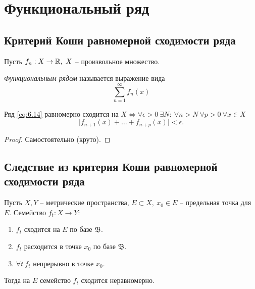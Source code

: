 \section{Функциональный ряд}

\setcounter{subsection}{79}

\subsection{Критерий Коши равномерной сходимости ряда}

\begin{definition}
    Пусть $f_n: X \rightarrow\mathbb{R}, \ X$ -- произвольное множество.

    \emph{Функциональным рядом} называется выражение вида
    \begin{equation}\label{eq:6.14}
        \sum_{n=1}^{\infty}f_n(x)
    \end{equation}
\end{definition}

\begin{theorem}
    Ряд \ref{eq:6.14} равномерно сходится на $X \iff \forall \epsilon > 0 \ \exists N: \ \forall n > N \ \forall p > 0 \ \forall x \in X$
    \[
        \big|f_{n+1}(x) + \ldots + f_{n+p}(x)\big| < \epsilon.
    \]
\end{theorem}

\begin{proof}
    Самостоятельно (круто).
\end{proof}

\subsection{Следствие из критерия Коши равномерной сходимости ряда}

\begin{corollary}
    Пусть $X,Y$ -- метрические пространства, $E \subset X, \ x_0 \in E$ -- предельная точка для $E$. Семейство $f_t: X \rightarrow Y$:
    \begin{enumerate}
        \item $f_t$ сходится на $E$ по базе $\mathfrak{B}$.
        \item $f_t$ расходится в точке $x_0$ по базе $\mathfrak{B}$.
        \item $\forall t \ f_t$ непрерывно в точке $x_0$.
    \end{enumerate}

    Тогда на $E$ семейство $f_t$ сходится неравномерно.
\end{corollary}

